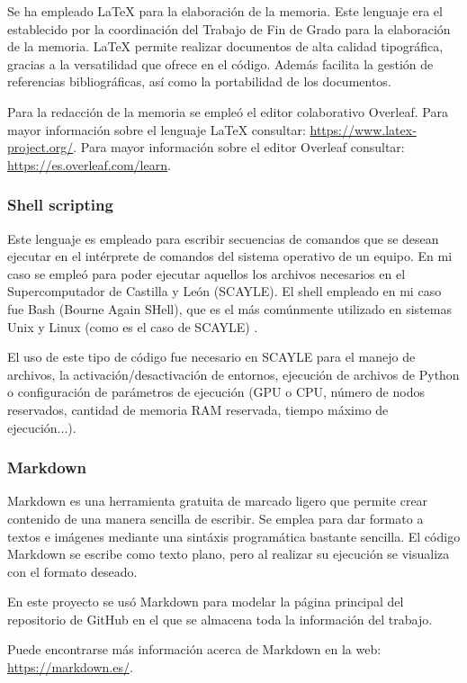 Se ha empleado LaTeX para la elaboración de la memoria. Este lenguaje era el establecido por la coordinación del Trabajo de Fin de Grado para la elaboración de la memoria. LaTeX permite realizar documentos de alta calidad tipográfica, gracias a la versatilidad que ofrece en el código. Además facilita la gestión de referencias bibliográficas, así como la portabilidad de los documentos. 

Para la redacción de la memoria se empleó el editor colaborativo Overleaf. Para mayor información sobre el lenguaje LaTeX consultar: \url{https://www.latex-project.org/}. Para mayor información sobre el editor Overleaf consultar: \url{https://es.overleaf.com/learn}.

\subsubsection{Shell scripting}

Este lenguaje es empleado para escribir secuencias de comandos que se desean ejecutar en el intérprete de comandos del sistema operativo de un equipo. En mi caso se empleó para poder ejecutar aquellos los archivos necesarios en el Supercomputador de Castilla y León (SCAYLE). El shell empleado en mi caso fue Bash (Bourne Again SHell), que es el más comúnmente utilizado en sistemas Unix y Linux (como es el caso de SCAYLE) \cite{met:bash}. 

El uso de este tipo de código fue necesario en  SCAYLE para el manejo de archivos, la activación/desactivación de entornos, ejecución de archivos de Python o configuración de parámetros de ejecución (GPU o CPU, número de nodos reservados, cantidad de memoria RAM reservada, tiempo máximo de ejecución...).

\subsubsection{Markdown}

Markdown es una herramienta gratuita de marcado ligero que permite crear contenido de una manera sencilla de escribir. Se emplea para dar formato a textos e imágenes mediante una sintáxis programática bastante sencilla. El código Markdown se escribe como texto plano, pero al realizar su ejecución se visualiza con el formato deseado. 

En este proyecto se usó Markdown para modelar la página principal del repositorio de GitHub en el que se almacena toda la información del trabajo.

Puede encontrarse más información acerca de Markdown en la web: \url{https://markdown.es/}.

